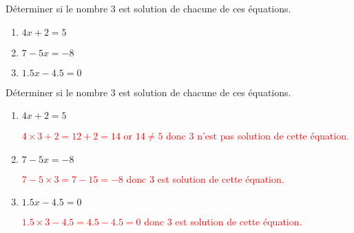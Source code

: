 \begin{exercice*}
    Déterminer si le nombre 3 est solution de chacune de ces équations.
    \begin{enumerate}
        \item $4x+2=5$
        \item $7-5x=-8$
        \item $\num{1.5}x-\num{4.5}=0$
    \end{enumerate}
\end{exercice*}
\begin{corrige}
    Déterminer si le nombre 3 est solution de chacune de ces équations.
    
    \begin{enumerate}
        \item $4x+2=5$
        
        \textcolor{red}{$4\times 3 + 2 = 12 + 2 = 14$ or $14 \neq 5$ donc $3$ n'est pas solution de cette équation.}
        \item $7-5x=-8$
        
        \textcolor{red}{$7-5\times 3 = 7-15 = -8$ donc $3$ est solution de cette équation.}
        \item $\num{1.5}x-\num{4.5}=0$
        
        \textcolor{red}{$\num{1.5}\times 3 - \num{4.5} = \num{4.5} - \num{4.5} = 0$ donc $3$ est solution de cette équation.}
    \end{enumerate}
\end{corrige}


